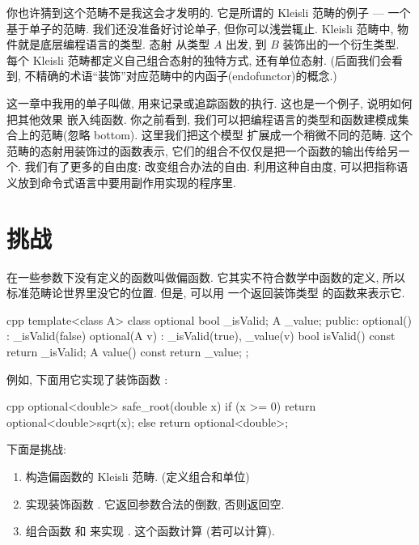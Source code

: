 你也许猜到这个范畴不是我这会才发明的. 它是所谓的 Kleisli 范畴的例子 --- 一个基于单子的范畴.
我们还没准备好讨论单子, 但你可以浅尝辄止. Kleisli 范畴中, 物件就是底层编程语言的类型. 态射
从类型 $A$ 出发, 到 $B$ 装饰出的一个衍生类型. 每个 Kleisli 范畴都定义自己组合态射的独特方式,
还有单位态射. (后面我们会看到, 不精确的术语``装饰''对应范畴中的内函子(endofunctor)的概念.)

这一章中我用的单子叫做, 用来记录或追踪函数的执行. 这也是一个例子, 说明如何把其他效果
嵌入纯函数. 你之前看到, 我们可以把编程语言的类型和函数建模成集合上的范畴(忽略 bottom). 这里我们把这个模型
扩展成一个稍微不同的范畴. 这个范畴的态射用装饰过的函数表示, 它们的组合不仅仅是把一个函数的输出传给另一个.
我们有了更多的自由度: 改变组合办法的自由. 利用这种自由度, 可以把指称语义放到命令式语言中要用副作用实现的程序里.

\section{挑战}

在一些参数下没有定义的函数叫做偏函数. 它其实不符合数学中函数的定义, 所以标准范畴论世界里没它的位置. 但是, 可以用
一个返回装饰类型  的函数来表示它.

\begin{snip}{cpp}
template<class A> class optional {
    bool _isValid;
    A _value;
public:
    optional()    : _isValid(false) {}
    optional(A v) : _isValid(true), _value(v) {}
    bool isValid() const { return _isValid; }
    A value() const { return _value; }
};
\end{snip}
例如, 下面用它实现了装饰函数 :

\begin{snip}{cpp}
optional<double> safe_root(double x) {
    if (x >= 0) return optional<double>{sqrt(x)};
    else return optional<double>{};
}
\end{snip}
下面是挑战:

\begin{enumerate}
  \tightlist
  \item
        构造偏函数的 Kleisli 范畴. (定义组合和单位)
  \item
        实现装饰函数 . 它返回参数合法的倒数, 否则返回空.
  \item
        组合函数  和  来实现 .
        这个函数计算  (若可以计算).
\end{enumerate}
